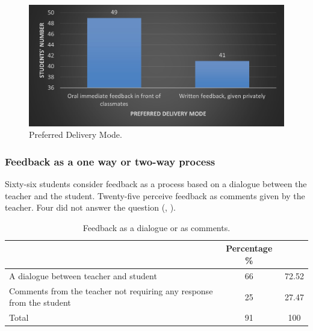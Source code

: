 \documentclass[english]{textolivre}
\begin{document}
\begin{figure}[h!]
 \centering
 \begin{minipage}{.85\textwidth}
 \includegraphics[width=\textwidth]{16.jpg}
 \caption{Preferred Delivery Mode.}
 \label{fig16}
 \end{minipage}
\end{figure}

\subsubsection{Feedback as a one way or two-way process}

Sixty-six students consider feedback as a process based on a dialogue between the teacher and the student. Twenty-five perceive feedback as comments given by the teacher. Four did not answer the question (, ).

\begin{table}[h!]
\centering
\begin{threeparttable}
\caption{Feedback as a dialogue or as comments.}
\label{tbl17}
\begin{tabular}{p{} c c}
\toprule
 & Percentage \% \\ \midrule
A dialogue between teacher and student & 66 & 72.52 \\
Comments from the teacher not requiring any response from the student & 25 & 27.47 \\
Total & 91 & 100 \\
\bottomrule
\end{tabular}
\end{threeparttable}
\end{table}
\end{document}
